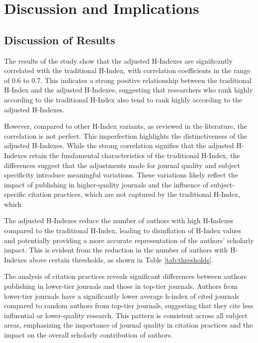 \chapter{Discussion and Implications}
\label{ch:discussion}

\section{Discussion of Results}

The results of the study show that the adjusted H-Indexes are significantly
correlated with the traditional H-Index, with correlation coefficients in the
range of 0.6 to 0.7. This indicates a strong positive relationship between the
traditional H-Index and the adjusted H-Indexes, suggesting that researchers who
rank highly according to the traditional H-Index also tend to rank highly
according to the adjusted H-Indexes.

However, compared to other H-Index variants, as reviewed in the literature, the
correlation is not perfect. This imperfection highlights the distinctiveness of
the adjusted H-Indexes. While the strong correlation signifies that the
adjusted H-Indexes retain the fundamental characteristics of the traditional
H-Index, the differences suggest that the adjustments made for journal quality
and subject specificity introduce meaningful variations. These variations
likely reflect the impact of publishing in higher-quality journals and the
influence of subject-specific citation practices, which are not captured by the
traditional H-Index, which

The adjusted H-Indexes reduce the number of authors with high H-Indexes
compared to the traditional H-Index, leading to disinflation of H-Index values
and potentially providing a more accurate representation of the authors'
scholarly impact. This is evident from the reduction in the number of authors
with H-Indexes above certain thresholds, as shown in Table
\ref{tab:thresholds}.

The analysis of citation practices reveals significant differences between
authors publishing in lower-tier journals and those in top-tier journals.
Authors from lower-tier journals have a significantly lower average h-index of
cited journals compared to random authors from top-tier journals, suggesting
that they cite less influential or lower-quality research. This pattern is
consistent across all subject areas, emphasizing the importance of journal
quality in citation practices and the impact on the overall scholarly
contribution of authors.

